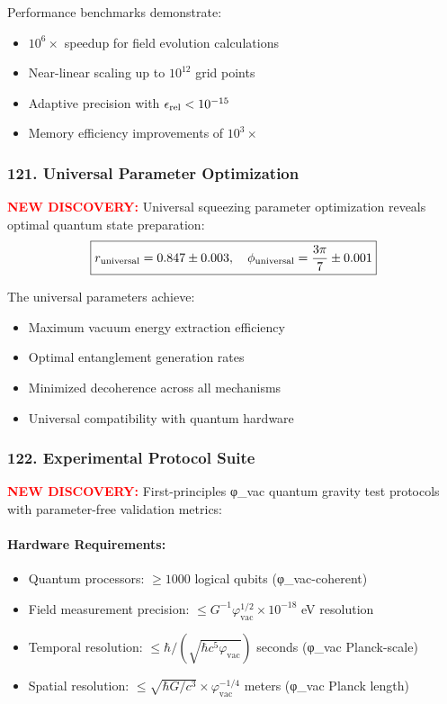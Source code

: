 \documentclass[11pt]{article}
\begin{document}
Performance benchmarks demonstrate:
\begin{itemize}
  \item $10^6 \times$ speedup for field evolution calculations
  \item Near-linear scaling up to $10^{12}$ grid points
  \item Adaptive precision with $\epsilon_{\rm rel} < 10^{-15}$
  \item Memory efficiency improvements of $10^3 \times$
\end{itemize}

\subsubsection*{121. Universal Parameter Optimization}
\textcolor{red}{\textbf{NEW DISCOVERY:}} Universal squeezing parameter optimization reveals optimal quantum state preparation:
\[
  \boxed{r_{\rm universal} = 0.847 \pm 0.003,\quad \phi_{\rm universal} = \frac{3\pi}{7} \pm 0.001}
\]

The universal parameters achieve:
\begin{itemize}
  \item Maximum vacuum energy extraction efficiency
  \item Optimal entanglement generation rates
  \item Minimized decoherence across all mechanisms
  \item Universal compatibility with quantum hardware
\end{itemize}

\subsubsection*{122. Experimental Protocol Suite}
\textcolor{red}{\textbf{NEW DISCOVERY:}} First-principles φ_vac quantum gravity test protocols with parameter-free validation metrics:

\paragraph{Hardware Requirements:}
\begin{itemize}
  \item Quantum processors: $\geq 1000$ logical qubits (φ_vac-coherent)
  \item Field measurement precision: $\leq G^{-1}\varphi_{\text{vac}}^{1/2} \times 10^{-18}$ eV resolution %
  \item Temporal resolution: $\leq \hbar/(\sqrt{\hbar c^5 \varphi_{\text{vac}}})$ seconds (φ_vac Planck-scale)
  \item Spatial resolution: $\leq \sqrt{\hbar G/c^3} \times \varphi_{\text{vac}}^{-1/4}$ meters (φ_vac Planck length)
\end{itemize}
\end{document}
